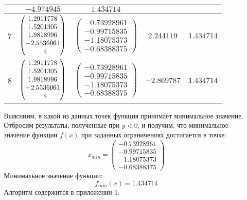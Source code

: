 \documentclass[a4paper, 14pt]{extarticle}
\begin{document}
\begin{longtable}[c]{ |c|c|c|c|c|}
	 		& $-4.974945$ & $1.434714$\\
	 		\hline
	 		7 & $\begin{pmatrix} 
	 			\vphantom{-}1.2911778\\
	 			\vphantom{-}1.5201305\\
	 			\vphantom{-}1.9818996\\
	 			-2.5536061\\
	 			\hphantom{-}4  
	 		\end{pmatrix}$ 
	 		& $\begin{pmatrix} 
	 			-0.73928961\\
	 			-0.99715835\\
	 			-1.18075373\\
	 			-0.68388375 
	 		\end{pmatrix}$ 
	 		& $2.244119$ & $1.434714$\\
	 		\hline
	 		8 & $\begin{pmatrix} 
	 			\vphantom{-}1.2911778\\
	 			\vphantom{-}1.5201305\\
	 			\vphantom{-}1.9818996\\
	 			-2.5536061\\
	 			\hphantom{-}4  
	 		\end{pmatrix}$ 
	 		& $\begin{pmatrix} 
	 			-0.73928961\\
	 			-0.99715835\\
	 			-1.18075373\\
	 			-0.68388375 
	 		\end{pmatrix}$ 
	 		& $-2.869787$ & $1.434714$\\
	 		\hline
	 	\end{longtable}
	 	Выясниим, в какой из данных точек функция принимает минимальное значение. Отбросим результаты, полученные при $y < 0$, и получим, что минимальное значение функции $f(x)$ при заданных ограничениях достигается в точке:
	 	\[
	 		x_{min} = 
	 		\begin{pmatrix}
	 			-0.73928961\\
	 			-0.99715835\\
	 			-1.18075373\\
	 			-0.68388375
	 		\end{pmatrix}
	 	 \]
	 	 Минимальное значение функции:
	 	 \[ f_{min}(x) = 1.434714 \]
	 	 Алгоритм содержится в приложении 1.
\end{document}
